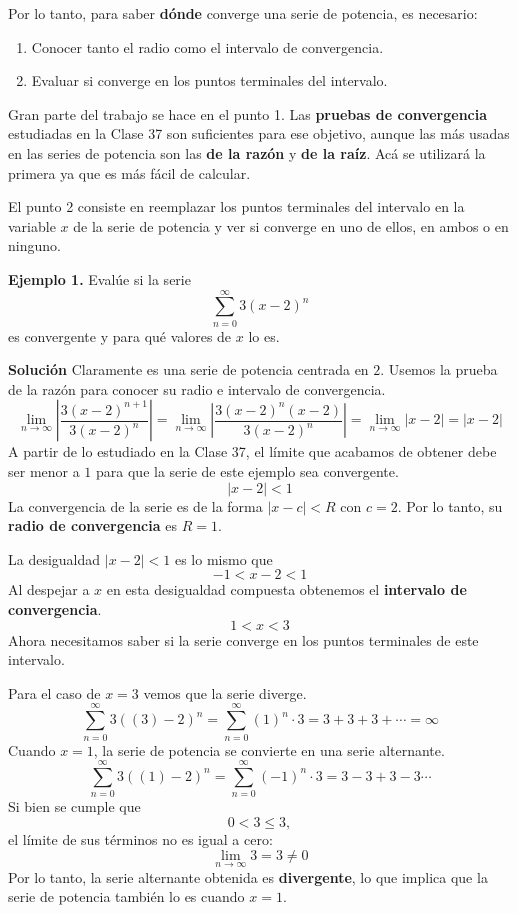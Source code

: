 \documentclass[12pt]{article}
\begin{document}
Por lo tanto, para saber \textbf{dónde} converge una serie de potencia, es necesario:

\begin{enumerate}
\item Conocer tanto el radio como el intervalo de convergencia.
\item Evaluar si converge en los puntos terminales del intervalo.
\end{enumerate}

Gran parte del trabajo se hace en el punto 1. Las \textbf{pruebas de convergencia} estudiadas en la Clase 37 son suficientes para ese objetivo, aunque las más usadas en las series de potencia son las \textbf{de la razón} y \textbf{de la raíz}. Acá se utilizará la primera ya que es más fácil de calcular.

El punto 2 consiste en reemplazar los puntos terminales del intervalo en la variable $x$ de la serie de potencia y ver si converge en uno de ellos, en ambos o en ninguno.

\textbf{Ejemplo 1.} Evalúe si la serie
\[
  \sum_{n = 0}^{\infty} 3(x - 2)^{n}
\]
es convergente y para qué valores de $x$ lo es.

\textbf{Solución} Claramente es una serie de potencia centrada en $2$. Usemos la prueba de la razón para conocer su radio e intervalo de convergencia.
\[
  \lim_{n \to \infty} \left|\frac{3(x - 2)^{n + 1}}{3(x - 2)^{n}}\right| = \lim_{n \to \infty} \left|\frac{3(x - 2)^{n}(x - 2)}{3(x - 2)^{n}}\right|
                                                                         = \lim_{n \to \infty} |x - 2|
                                                                         = |x - 2|
\]
A partir de lo estudiado en la Clase 37, el límite que acabamos de obtener debe ser menor a $1$ para que la serie de este ejemplo sea convergente.
\[
  |x - 2| < 1
\]
La convergencia de la serie es de la forma $|x - c| < R$ con $c = 2$. Por lo tanto, su \textbf{radio de convergencia} es $R = 1$.

La desigualdad $|x - 2| < 1$ es lo mismo que
\[
  -1 < x - 2 < 1
\]
Al despejar a $x$ en esta desigualdad compuesta obtenemos el \textbf{intervalo de convergencia}.
\[
  1 < x < 3
\]
Ahora necesitamos saber si la serie converge en los puntos terminales de este intervalo.

Para el caso de $x = 3$ vemos que la serie diverge.
\[
  \sum_{n = 0}^{\infty} 3((3) - 2)^{n} = \sum_{n = 0}^{\infty} (1)^{n} \cdot 3 = 3 + 3 + 3 + \cdots = \infty
\]
Cuando $x = 1$, la serie de potencia se convierte en una serie alternante.
\[
  \sum_{n = 0}^{\infty} 3((1) - 2)^{n} = \sum_{n = 0}^{\infty} (-1)^{n} \cdot 3 = 3 - 3 + 3 - 3 \cdots
\]
Si bien se cumple que
\[
  0 < 3 \leq 3,
\]
el límite de sus términos no es igual a cero:
\[
  \lim_{n \to \infty} 3 = 3 \neq 0
\]
Por lo tanto, la serie alternante obtenida es \textbf{divergente}, lo que implica que la serie de potencia también lo es cuando $x = 1$.
\end{document}
